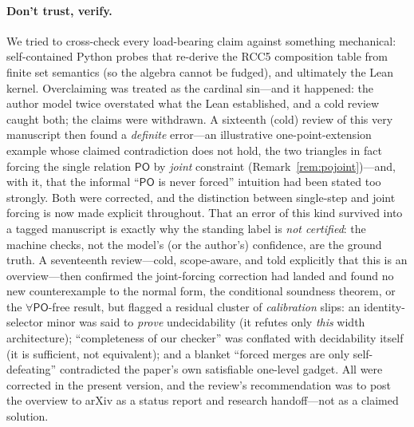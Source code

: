 \documentclass[11pt]{article}
\newcommand{\PO}{\mathsf{PO}}
\theoremstyle{plain}
\theoremstyle{definition}
\begin{document}
\paragraph{Don't trust, verify.} We tried to cross-check every
load-bearing claim against something mechanical: self-contained Python probes
that re-derive the RCC5 composition table from finite set semantics
(so the algebra cannot be fudged), and ultimately the Lean kernel.
Overclaiming was treated as the cardinal sin---and it happened: the
author model twice overstated what the Lean established, and a cold
review caught both; the claims were withdrawn. A sixteenth (cold) review of
this very manuscript then found a \emph{definite} error---an illustrative
one-point-extension example whose claimed contradiction does not hold, the
two triangles in fact forcing the single relation $\PO$ by \emph{joint}
constraint (Remark~\ref{rem:pojoint})---and, with it, that the informal
``$\PO$ is never forced'' intuition had been stated too strongly. Both were
corrected, and the distinction between single-step and joint forcing is now
made explicit throughout. That an error of this kind survived into a tagged
manuscript is exactly why the standing label is \emph{not certified}: the
machine checks, not the model's (or the author's) confidence, are the ground
truth. A seventeenth review---cold, scope-aware, and told explicitly that
this is an overview---then confirmed the joint-forcing correction had landed
and found no new counterexample to the normal form, the conditional
soundness theorem, or the $\forall\PO$-free result, but flagged a residual
cluster of \emph{calibration} slips: an identity-selector minor was said to
\emph{prove} undecidability (it refutes only \emph{this} width
architecture); ``completeness of our checker'' was conflated with
decidability itself (it is sufficient, not equivalent); and a blanket
``forced merges are only self-defeating'' contradicted the paper's own
satisfiable one-level gadget. All were corrected in the present version,
and the review's recommendation was to post the overview to arXiv as a
status report and research handoff---not as a claimed solution.
\end{document}
